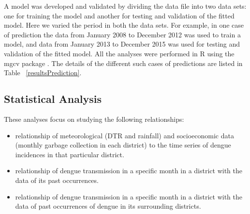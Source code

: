 \documentclass{bmcart}
\begin{document}
A model was developed and validated by dividing the data file into two data sets: one for training the model and another for testing and validation of the fitted model. Here we varied the period in both the data sets. For example, in one case of prediction the data from January 2008 to December 2012 was used to train a model, and data from January 2013 to December 2015 was used for testing and validation of the fitted model. All the analyses were performed in R \cite{Rsoftware} using the mgcv package \cite{mgcv}.  The details of the different such cases of predictions are listed in Table ~\ref{resultsPrediction}.  













\subsection{Statistical Analysis} \label{stat}

These analyses focus on studying the following relationships:

\begin{itemize}
	\item relationship of meteorological (DTR and rainfall) and socioeconomic data (monthly garbage collection in each district) to the time series of dengue incidences in that particular district. 
	\item relationship of dengue transmission in a specific month in a district with the data of its past occurrences. 
	\item relationship of dengue transmission in a specific month in a district with the data of past occurrences of dengue in its surrounding districts. 
\end{itemize}
\end{document}
